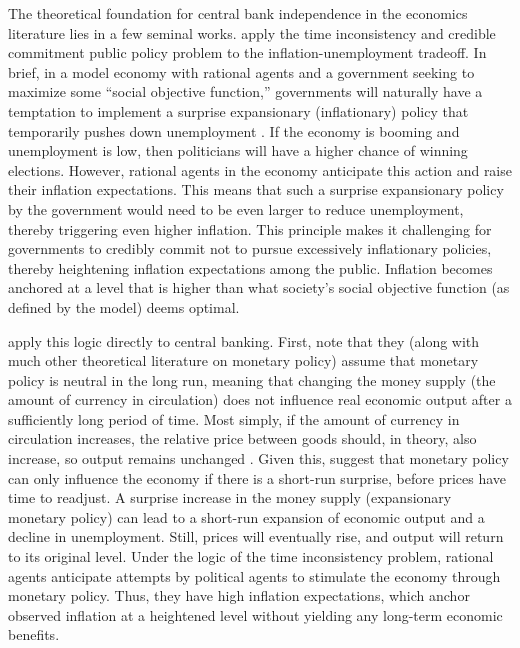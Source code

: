 \documentclass[12pt,a4paper]{article}
\begin{document}
\begin{doublespace}


The theoretical foundation for central bank independence in the economics literature lies in a few seminal works. \textcite{kydland_rules_1977} apply the time inconsistency and credible commitment public policy problem to the inflation-unemployment tradeoff. In brief, in a model economy with rational agents and a government seeking to maximize some ``social objective function,'' governments will naturally have a temptation to implement a surprise expansionary (inflationary) policy that temporarily pushes down unemployment \parencite[473]{kydland_rules_1977}. If the economy is booming and unemployment is low, then politicians will have a higher chance of winning elections. However, rational agents in the economy anticipate this action and raise their inflation expectations. This means that such a surprise expansionary policy by the government would need to be even larger to reduce unemployment, thereby triggering even higher inflation. This principle makes it challenging for governments to credibly commit not to pursue excessively inflationary policies, thereby heightening inflation expectations among the public. Inflation becomes anchored at a level that is higher than what society’s social objective function (as defined by the model) deems optimal.

\textcite{barro_rules_1983} apply this logic directly to central banking. First, note that they (along with much other theoretical literature on monetary policy) assume that monetary policy is neutral in the long run, meaning that changing the money supply (the amount of currency in circulation) does not influence real economic output after a sufficiently long period of time. Most simply, if the amount of currency in circulation increases, the relative price between goods should, in theory, also increase, so output remains unchanged \parencite[49-50]{downey_our_2025}. Given this, \textcite{barro_rules_1983} suggest that monetary policy can only influence the economy if there is a short-run surprise, before prices have time to readjust. A surprise increase in the money supply (expansionary monetary policy) can lead to a short-run expansion of economic output and a decline in unemployment. Still, prices will eventually rise, and output will return to its original level. Under the logic of the time inconsistency problem, rational agents anticipate attempts by political agents to stimulate the economy through monetary policy. Thus, they have high inflation expectations, which anchor observed inflation at a heightened level without yielding any long-term economic benefits. 


\end{doublespace}
\end{document}
